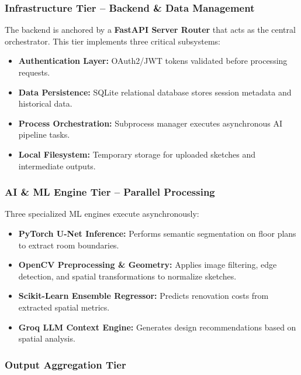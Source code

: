 \documentclass[12pt]{report}
\begin{document}
\subsubsection{Infrastructure Tier -- Backend \& Data Management}

The backend is anchored by a \textbf{FastAPI Server Router}\cite{fastapi2024} that acts as the central orchestrator. This tier implements three critical subsystems:

\begin{itemize}
  \item \textbf{Authentication Layer:} OAuth2/JWT tokens validated before processing requests.
  \item \textbf{Data Persistence:} SQLite\cite{fastapi2024} relational database stores session metadata and historical data.
  \item \textbf{Process Orchestration:} Subprocess manager executes asynchronous AI pipeline tasks\cite{fastapi2024}.
  \item \textbf{Local Filesystem:} Temporary storage for uploaded sketches and intermediate outputs.
\end{itemize}

\subsubsection{AI \& ML Engine Tier -- Parallel Processing}

Three specialized ML engines execute asynchronously:

\begin{itemize}
  \item \textbf{PyTorch U-Net Inference\cite{ronneberger2015}:} Performs semantic segmentation on floor plans to extract room boundaries.
  \item \textbf{OpenCV Preprocessing \& Geometry\cite{opencv2024}:} Applies image filtering, edge detection\cite{canny1986}, and spatial transformations to normalize sketches.
  \item \textbf{Scikit-Learn Ensemble Regressor\cite{sklearn2024, wang2020, breiman2001}:} Predicts renovation costs from extracted spatial metrics.
  \item \textbf{Groq LLM Context Engine\cite{groq2024, brown2020}:} Generates design recommendations based on spatial analysis.
\end{itemize}

\subsubsection{Output Aggregation Tier}
\end{document}

